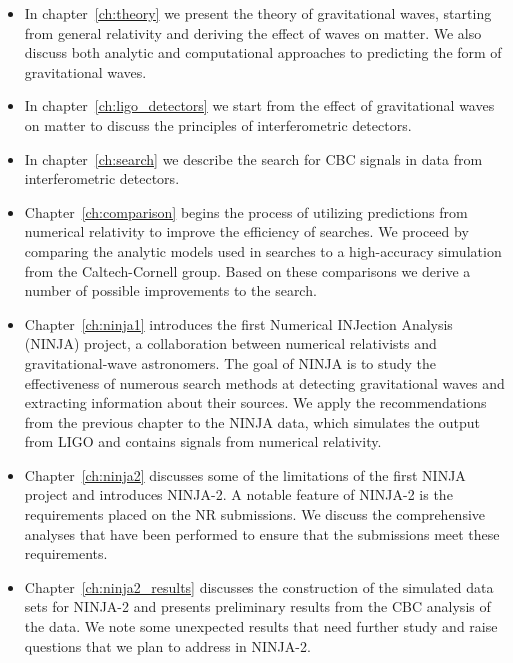 \begin{itemize}

\item In chapter~\ref{ch:theory} we present the theory of
gravitational waves, starting from general relativity and deriving
the effect of waves on matter.  We also discuss both analytic and
computational approaches to predicting the form of gravitational
waves.

\item In chapter~\ref{ch:ligo_detectors} we start from the effect of
gravitational waves on matter to discuss the principles of
interferometric detectors. 

\item In chapter~\ref{ch:search} we describe the search for CBC
signals in data from interferometric detectors.

\item Chapter~\ref{ch:comparison} begins the process of utilizing
predictions from numerical relativity to improve the efficiency of
searches.  We proceed by comparing the analytic models used in
searches to a high-accuracy simulation from the Caltech-Cornell group.
Based on these comparisons we derive a number of possible improvements
to the search.

\item Chapter~\ref{ch:ninja1} introduces the first Numerical INJection
Analysis (NINJA) project, a collaboration between numerical
relativists and gravitational-wave astronomers.  The goal of NINJA is
to study the effectiveness of numerous search methods at detecting
gravitational waves and extracting information about their sources.
We apply the recommendations from the previous chapter to the NINJA
data, which simulates the output from LIGO and contains signals from
numerical relativity.

\item Chapter~\ref{ch:ninja2} discusses some of the limitations of the
first NINJA project and introduces NINJA-2.  A notable feature of
NINJA-2 is the requirements placed on the NR submissions.  We discuss 
the comprehensive analyses that have been performed to ensure that the
submissions meet these requirements.

\item Chapter~\ref{ch:ninja2_results} discusses the construction of the
simulated data sets for NINJA-2 and presents preliminary results from
the CBC analysis of the data.  We note some unexpected results that
need further study and raise questions that we plan to address in
NINJA-2.


\end{itemize}

